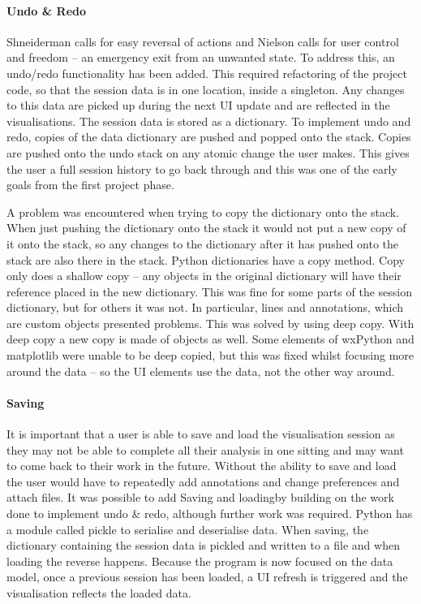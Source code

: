 \paragraph{Undo \& Redo}
Shneiderman calls for easy reversal of actions and Nielson calls for user control and freedom -- an emergency exit from an unwanted state.  To address this, an undo/redo functionality has been added.  This required refactoring of the project code, so that the session data is in one location, inside a singleton. Any changes to this data are picked up during the next \ac{UI} update and are reflected in the visualisations.  The session data is stored as a dictionary.  To implement undo and redo, copies of the data dictionary are pushed and popped onto the stack.  Copies are pushed onto the undo stack on any atomic change the user makes.  This gives the user a full session history to go back through and this was one of the early goals from the first project phase.

A problem was encountered when trying to copy the dictionary onto the stack.  When just pushing the dictionary onto the stack it would not put a new copy of it onto the stack, so any changes to the dictionary after it has pushed onto the stack are also there in the stack.  Python dictionaries have a copy method.  Copy only does a shallow copy -- any objects in the original dictionary will have their reference placed in the new dictionary.  This was fine for some parts of the session dictionary, but for others it was not. In particular, lines and annotations, which are custom objects presented problems.  This was solved by using deep copy.  With deep copy a new copy is made of objects as well.  Some elements of wxPython and matplotlib were unable to be deep copied, but this was fixed whilst focusing more around the data -- so the \ac{UI} elements use the data, not the other way around.

\paragraph{Saving}

It is important that a user is able to save and load the visualisation session as they may not be able to complete all their analysis in one sitting and may want to come back to their work in the future.  Without the ability to save and load the user would have to repeatedly add annotations and change preferences and attach files.  It was possible to add Saving and loadingby building on the work done to implement undo \& redo, although further work was required. Python has a module called pickle to serialise and deserialise data.  When saving, the dictionary containing the session data is pickled and written to a file and when loading the reverse happens.  Because the program is now focused on the data model, once a previous session has been loaded, a \ac{UI} refresh is triggered and the visualisation reflects the loaded data.


